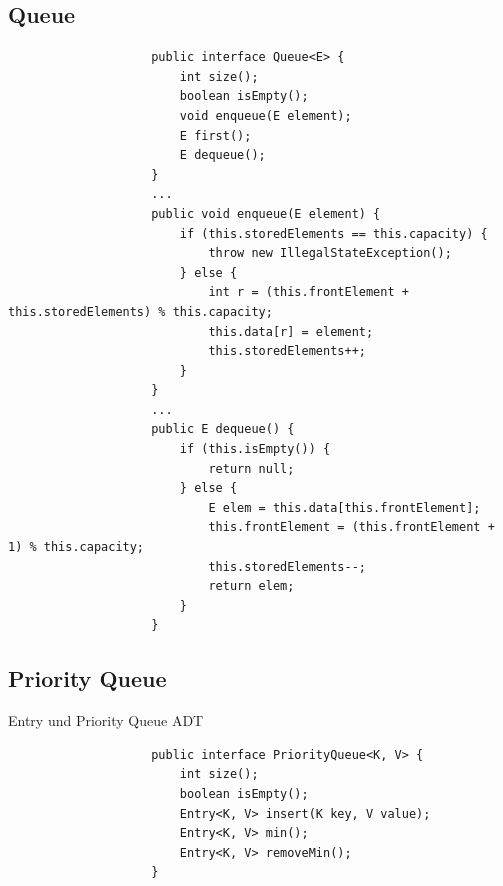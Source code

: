 \documentclass[a4paper, landscape, 8pt]{scrartcl}
\begin{document}
\begin{multicols*}{4}
            \subsection{Queue}
                \begin{lstlisting}
                    public interface Queue<E> {
                        int size();
                        boolean isEmpty();
                        void enqueue(E element);
                        E first();
                        E dequeue();
                    }
                    ...
                    public void enqueue(E element) {
                        if (this.storedElements == this.capacity) {
                            throw new IllegalStateException();
                        } else {
                            int r = (this.frontElement + this.storedElements) % this.capacity;
                            this.data[r] = element;
                            this.storedElements++;
                        }
                    }
                    ...
                    public E dequeue() {
                        if (this.isEmpty()) {
                            return null;
                        } else {
                            E elem = this.data[this.frontElement];
                            this.frontElement = (this.frontElement + 1) % this.capacity;
                            this.storedElements--;
                            return elem;
                        }
                    }
                \end{lstlisting}


            \subsection{Priority Queue}
                \textcolor{subsectioncolor}{Entry und Priority Queue ADT}
                \begin{lstlisting}
                    public interface PriorityQueue<K, V> {
                        int size();
                        boolean isEmpty();
                        Entry<K, V> insert(K key, V value);
                        Entry<K, V> min();
                        Entry<K, V> removeMin();
                    }


\end{lstlisting}
\end{multicols*}
\end{document}
